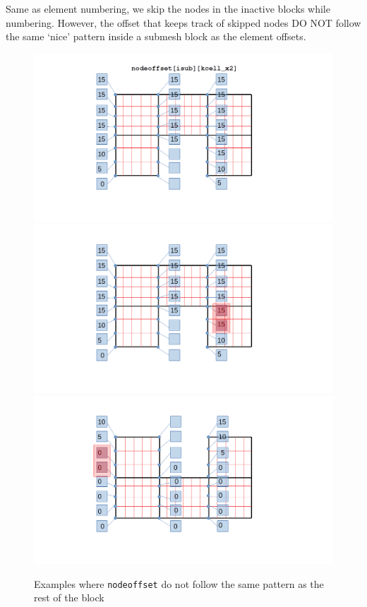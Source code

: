 \documentclass[a4paper,12pt]{article}
\begin{document}
Same as element numbering, we skip the nodes in the inactive blocks while numbering. However, the offset that keeps track of skipped nodes DO NOT follow the same `nice' pattern inside a submesh block as the element offsets. 
\begin{figure}[H]
	\centering
	\includegraphics[trim=140 100 200 25,clip,scale=0.3]{figures/NodeOffset.png}\\	
	\includegraphics[trim=140 100 200 25,clip,scale=0.3]{figures/NodeOffset_Exception-1.png}
	\includegraphics[trim=140 100 200 25,clip,scale=0.3]{figures/NodeOffset_Exception-2.png}
	\caption{Examples where \texttt{nodeoffset} do not follow the same pattern as the rest of the block}	
\end{figure}
\end{document}
